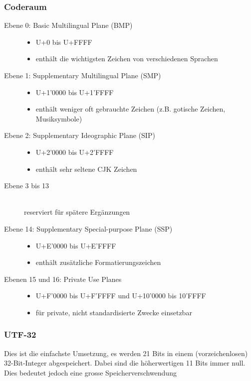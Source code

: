 \documentclass[a4paper,10pt]{article}
\begin{document}
\subsubsection{Coderaum}
\begin{description}
	\item[Ebene 0: Basic Multilingual Plane (BMP)] \hfill
		\begin{itemize}
			\item U+0 bis U+FFFF
			\item enth\"alt die wichtigsten Zeichen von verschiedenen Sprachen
		\end{itemize}
	\item[Ebene 1: Supplementary Multilingual Plane (SMP)] \hfill
		\begin{itemize}
			\item U+1'0000 bis U+1'FFFF
			\item enth\"alt weniger oft gebrauchte Zeichen (z.B. gotische Zeichen, Musiksymbole)
		\end{itemize}
	\item[Ebene 2: Supplementary Ideographic Plane (SIP)] \hfill
		\begin{itemize}
			\item U+2'0000 bis U+2'FFFF
			\item enth\"alt sehr seltene CJK Zeichen
		\end{itemize}
	\item[Ebene 3 bis 13] \hfill \\
		reserviert für spätere Erg\"anzungen
	\item[Ebene 14: Supplementary Special-purpose Plane (SSP)] \hfill
		\begin{itemize}
			\item U+E'0000 bis U+E'FFFF
			\item enth\"alt zus\"atzliche Formatierungszeichen
		\end{itemize}
	\item[Ebenen 15 und 16: Private Use Planes] \hfill
		\begin{itemize}
			\item U+F'0000 bis U+F'FFFF und U+10'0000 bis 10'FFFF
			\item f\"ur private, nicht standardisierte Zwecke einsetzbar
		\end{itemize}
\end{description}

\subsubsection{UTF-32}
Dies ist die einfachste Umsetzung, es werden 21 Bits in einem (vorzeichenlosen) 32-Bit-Integer abgespeichert. Dabei sind die h\"oherwertigen 11 Bits immer null. Dies bedeutet jedoch eine grosse Speicherverschwendung
\end{document}
